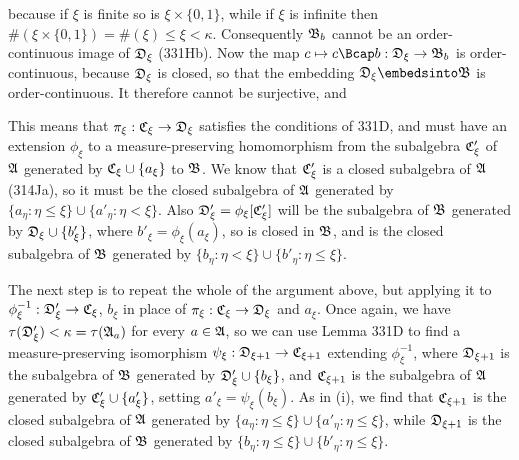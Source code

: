 {

\noindent because if $\xi$ is finite so is $\xi\times\{0,1\}$, while if
$\xi$ is infinite then $\#(\xi\times\{0,1\})=\#(\xi)\le\xi<\kappa$.
Consequently $\frak B_b$ cannot be an order-continuous image of
$\frak D_{\xi}$ (331Hb).   Now the map
$c\mapsto c\Bcap b:\frak D_{\xi}\to\frak B_b$ is order-continuous, because
$\frak D_{\xi}$ is closed, so that the
embedding $\frak D_{\xi}\embedsinto\frak B$ is order-continuous.
It therefore cannot be surjective, and


This means that $\pi_{\xi}:\frak C_{\xi}\to\frak D_{\xi}$ satisfies the
conditions of 331D, and must have an extension $\phi_{\xi}$ to a
measure-preserving homomorphism from the subalgebra $\frak C'_{\xi}$ of
$\frak A$ generated by $\frak C_{\xi}\cup\{a_{\xi}\}$ to $\frak B$.
We know that $\frak C'_{\xi}$ is a closed subalgebra of $\frak A$
(314Ja), so it must be the closed subalgebra of $\frak A$ generated by
$\{a_{\eta}:\eta\le\xi\}\cup\{a'_{\eta}:\eta<\xi\}$.   Also $\frak
D'_{\xi}=\phi_{\xi}[\frak C'_{\xi}]$ will be the subalgebra of $\frak B$
generated by $\frak D_{\xi}\cup\{b'_{\xi}\}$, where
$b'_{\xi}=\phi_{\xi}(a_{\xi})$, so is closed in $\frak B$, and is
the closed subalgebra of $\frak B$ generated by
$\{b_{\eta}:\eta<\xi\}\cup\{b'_{\eta}:\eta\le\xi\}$.

\medskip

 The next step is to repeat the whole of the argument
above, but applying it to 
$\phi_{\xi}^{-1}:\frak D'_{\xi}\to\frak C_{\xi}$, $b_{\xi}$ in place of 
$\pi_{\xi}:\frak C_{\xi}\to\frak D_{\xi}$ and $a_{\xi}$.   Once again, we 
have $\tau(\frak D'_{\xi})<\kappa=\tau(\frak A_a)$ for every 
$a\in\frak A$, so we can use
Lemma 331D to find a measure-preserving isomorphism 
$\psi_{\xi}:\frak D_{\xi+1}\to\frak C_{\xi+1}$ extending 
$\phi_{\xi}^{-1}$, where $\frak D_{\xi+1}$ is the subalgebra of $\frak B$ 
generated by 
$\frak D'_{\xi}\cup\{b_{\xi}\}$, and $\frak C_{\xi+1}$ is the subalgebra of
$\frak A$ generated by $\frak C'_{\xi}\cup\{a'_{\xi}\}$, setting
$a'_{\xi}=\psi_{\xi}(b_{\xi})$.   As in (i), we find that 
$\frak C_{\xi+1}$ is the closed subalgebra of $\frak A$ generated by
$\{a_{\eta}:\eta\le\xi\}\cup\{a'_{\eta}:\eta\le\xi\}$, while 
$\frak D_{\xi+1}$ is the closed subalgebra of $\frak B$ generated by
$\{b_{\eta}:\eta\le\xi\}\cup\{b'_{\eta}:\eta\le\xi\}$.

}
